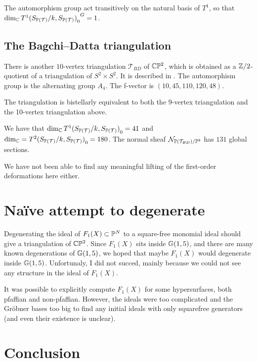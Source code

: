 The automorphism group act transitively on the natural basis of $T^1$, so that $\dim_\C {{T^1(S_{\P(\mathcal T)}/k, S_{\P(\mathcal T)})}_0}^G=1$. 

\subsection{The Bagchi--Datta triangulation}

There is another $10$-vertex triangulation $\mathcal T_{BD}$ of $\C \P^2$, which is obtained as a $\Z/2$-quotient of a triangulation of $S^2 \times S^2$. It is described in \cite{bagchi_datta}. The automorphism group is the alternating group $A_4$. The f-vector is $(10,45,110,120,48)$.

The triangulation is bistellarly equivalent to both the 9-vertex triangulation and the 10-vertex triangulation above.

\begin{proposition}
We have that $\dim_\C  {T^1(S_{\P(\mathcal T)}/k, S_{\P(\mathcal T)})}_0=41$ and $\dim_\C = {T^2(S_{\P(\mathcal T)}/k, S_{\P(\mathcal T)})}_0=180$. The normal sheaf $\mathcal N_{\P(\mathcal T_{BD})/\P^{8}}$ has $131$ global sections.
\end{proposition}

We have not been able to find any meaningful lifting of the first-order deformations here either.

\section{Naïve attempt to degenerate}

Degenerating the ideal of $F_1(X) \subset \P^N$ to a square-free monomial ideal should give a triangulation of $\C \P^2$. Since $F_1(X)$ sits inside $\Gr(1,5)$, and there are many known degenerations of $\Gr(1,5)$, we hoped that maybe $F_1(X)$ would degenerate inside $\Gr(1,5)$. Unfortunaly, I did not succed, mainly because we could not see any structure in the ideal of $F_1(X)$.

It was possible to explicitly compute $F_1(X)$ for some hypersurfaces, both pfaffian and non-pfaffian. However, the ideals were too complicated and the Gröbner bases too big to find any initial ideals with only squarefree generators (and even their existence is unclear).

\section{Conclusion}

